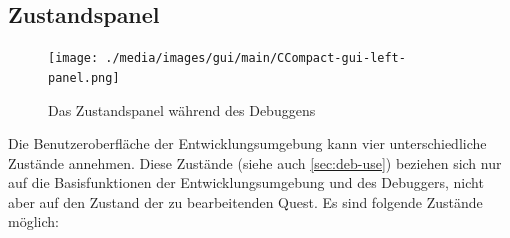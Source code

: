 \subsection{Zustandspanel}
\label{sec:gui-main-left-zust}

\begin{figure}[htbp] 
  \centering
     \texttt{[image: ./media/images/gui/main/CCompact-gui-left-panel.png]}
  \caption{Das Zustandspanel während des Debuggens}
  \label{fig:gui-main-left-panel}
\end{figure}

Die Benutzeroberfläche der Entwicklungsumgebung kann vier unterschiedliche Zustände annehmen. Diese Zustände (siehe auch \ref{sec:deb-use}) beziehen sich nur auf die Basisfunktionen der Entwicklungsumgebung und des Debuggers, nicht aber auf den Zustand der zu bearbeitenden Quest. Es sind folgende Zustände möglich:
